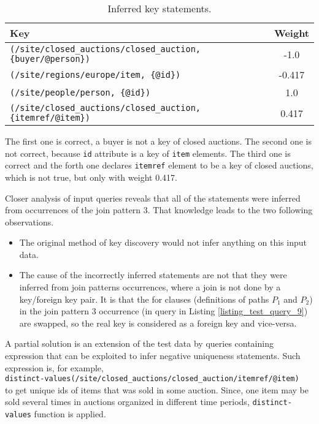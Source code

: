 \begin{table}
\label{TAB_inferred_keys}
\caption{Inferred key statements.}
\begin{tabular}{|l|c|}
\hline
\textbf{Key} & \textbf{Weight} \\ \hline \hline
\texttt{(/site/closed\_auctions/closed\_auction, \{buyer/@person\})} & -1.0 \\ \hline
\texttt{(/site/regions/europe/item, \{@id\})} & -0.417 \\ \hline
\texttt{(/site/people/person, \{@id\})} & 1.0 \\ \hline
\texttt{(/site/closed\_auctions/closed\_auction, \{itemref/@item\})} & 0.417 \\ \hline
\end{tabular}
\end{table}

The first one is correct, a buyer is not a key of closed auctions. The second one is not correct, because \texttt{id} attribute is a key of \texttt{item} elements. The third one is correct and the forth one declares \texttt{itemref} element to be a key of closed auctions, which is not true, but only with weight 0.417.

Closer analysis of input queries reveals that all of the statements were inferred from occurrences of the join pattern 3. That knowledge leads to the two following observations.

\begin{itemize}
\item The original method of key discovery would not infer anything on this input data.
\item The cause of the incorrectly inferred statements are not that they were inferred from join patterns occurrences, where a join is not done by a key/foreign key pair. It is that the for clauses (definitions of paths $P_1$ and $P_2$) in the join pattern 3 occurrence (in query in Listing \ref{listing_test_query_9}) are swapped, so the real key is considered as a foreign key and vice-versa.
\end{itemize}

A partial solution is an extension of the test data by queries containing expression that can be exploited to infer negative uniqueness statements. Such expression is, for example,\\ \texttt{distinct-values(/site/closed\_auctions/closed\_auction/itemref/@item)}\\ to get unique ids of items that was sold in some auction. Since, one item may be sold several times in auctions organized in different time periods, \texttt{distinct-values} function is applied.

